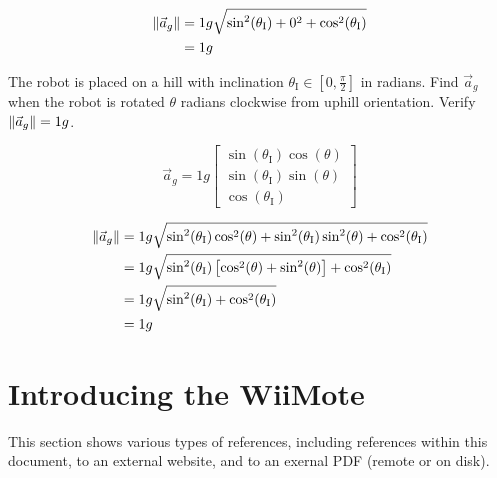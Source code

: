 \begin{asparaenum}
\begin{compactenum}
\begin{solution}
        \begin{equation*}
        \begin{aligned}
        \lVert\vec{a}_g\rVert&= 1g\sqrt{\sin^2(\theta_\text{I})+0^2+\cos^2(\theta_\text{I})}
        \\ &= 1g
        \end{aligned}
        \end{equation*}
        \end{solution}

    \item The robot is placed on a hill with inclination $\theta_\text{I}\in\left[0,\tfrac{\pi}{2}\right]$ in radians. Find $\vec{a}_g$ when the robot is rotated $\theta$ radians clockwise from uphill orientation. Verify $\lVert\vec{a}_g\rVert=1g$.
        \begin{solution}
        \begin{equation*}
        \vec{a}_g=1g\begin{bmatrix}
            \sin(\theta_\text{I})\cos(\theta) \\
            \sin(\theta_\text{I})\sin(\theta) \\
            \cos(\theta_\text{I})
            \end{bmatrix}
        \end{equation*}

        \begin{equation*}
        \begin{aligned}
        \lVert\vec{a}_g\rVert&=1g\sqrt{\sin^2(\theta_\text{I})\cos^2(\theta)+\sin^2(\theta_\text{I})\sin^2(\theta)+\cos^2(\theta_\text{I})} \\ &= 1g\sqrt{\sin^2(\theta_\text{I})\left[\cos^2(\theta)+\sin^2(\theta)\right]+\cos^2(\theta_\text{I})} \\ &= 1g\sqrt{\sin^2(\theta_\text{I})+\cos^2(\theta_\text{I})} \\ &= 1g
        \end{aligned}
        \end{equation*}
        \end{solution}
    \end{compactenum}
\end{asparaenum}


\section{Introducing the WiiMote}\label{sec:topic2-wiimote}
This section shows various types of references, including references within this document, to an external website, and to an exernal PDF (remote or on disk).


